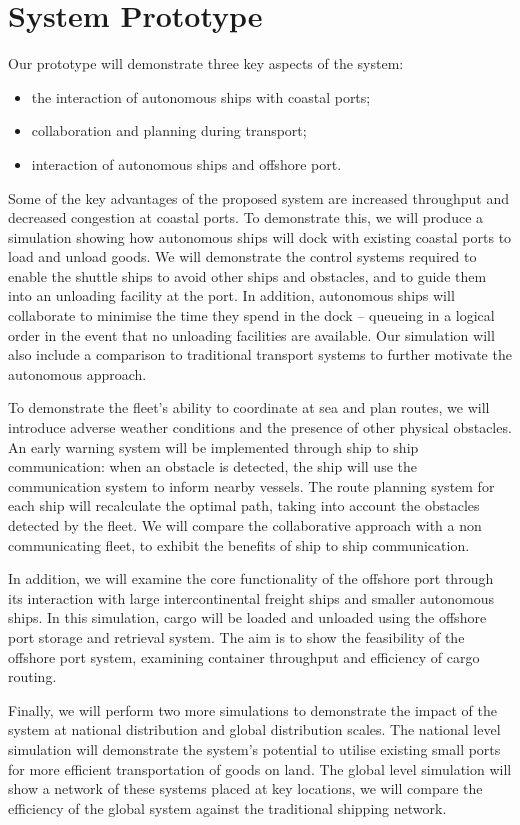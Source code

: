 \section{System Prototype}
Our prototype will demonstrate three key aspects of the system:
\begin{itemize}[noitemsep,topsep=0pt]
	\item the interaction of autonomous ships with coastal ports;
	\item collaboration and planning during transport;
	\item interaction of autonomous ships and offshore port.
\end{itemize}

Some of the key advantages of the proposed system are increased throughput and decreased congestion at coastal ports. To demonstrate this, we will produce a simulation showing how autonomous ships will dock with existing coastal ports to load and unload goods. We will demonstrate the control systems required to enable the shuttle ships to avoid other ships and obstacles, and to guide them into an unloading facility at the port. In addition, autonomous ships will collaborate to minimise the time they spend in the dock -- queueing in a logical order in the event that no unloading facilities are available. Our simulation will also include a comparison to traditional transport systems to further motivate the autonomous approach.

To demonstrate the fleet’s ability to coordinate at sea and plan routes, we will introduce adverse weather conditions and the presence of other physical obstacles. An early warning system will be implemented through ship to ship communication: when an obstacle is detected, the ship will use the communication system to inform nearby vessels. The route planning system for each ship will recalculate the optimal path, taking into account the obstacles detected by the fleet. We will compare the collaborative approach with a non communicating fleet, to exhibit the benefits of ship to ship communication.

In addition, we will examine the core functionality of the offshore port through its interaction with large intercontinental freight ships and smaller autonomous ships. In this simulation, cargo will be loaded and unloaded using the offshore port storage and retrieval system. The aim is to show the feasibility of the offshore port system, examining container throughput and efficiency of cargo routing.

Finally, we will perform two more simulations to demonstrate the impact of the system at national distribution and global distribution scales. The national level simulation will demonstrate the system’s potential to utilise existing small ports for more efficient transportation of goods on land. The global level simulation will show a network of these systems placed at key locations, we will compare the efficiency of the global system against the traditional shipping network.
